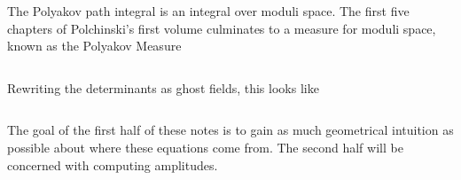 The Polyakov path integral is an integral over moduli space. The first five chapters of Polchinski's first volume \cite{polchinski} culminates to a measure for moduli space, known as the Polyakov Measure

    \begin{equation}
    \end{equation}

Rewriting the determinants as ghost fields, this looks like

    \begin{equation}
    \end{equation}


The goal of the first half of these notes is to gain as much geometrical intuition as possible about where these equations come from. The second half will be concerned with computing amplitudes.